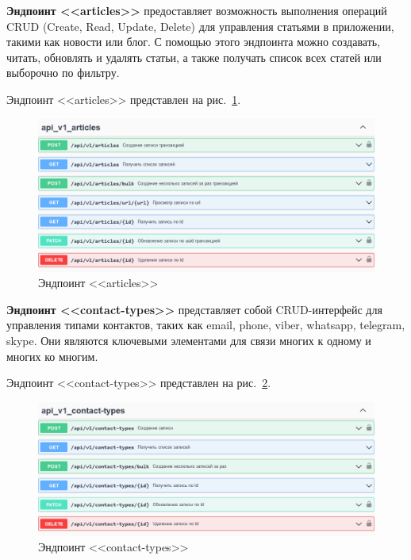 \textbf{Эндпоинт <<articles>>} предоставляет возможность выполнения операций CRUD (Create, Read, Update, Delete) для управления статьями в приложении,
такими как новости или блог.
С помощью этого эндпоинта можно создавать, читать, обновлять и удалять статьи,
а также получать список всех статей или выборочно по фильтру.

Эндпоинт <<articles>> представлен на рис.~\ref{fig:swagger_articles}.

\begin{figure}[!p]
    \centering

    \includegraphics[width=16cm]
    {images/swagger/articles.png}

    \caption{Эндпоинт <<articles>>}

    \label{fig:swagger_articles}
\end{figure}

\textbf{Эндпоинт <<contact-types>>} представляет собой CRUD-интерфейс для управления типами контактов,
таких как email, phone, viber, whatsapp, telegram, skype.
Они являются ключевыми элементами для связи многих к одному и многих ко многим.

Эндпоинт <<contact-types>> представлен на рис.~\ref{fig:swagger_contact_types}.

\begin{figure}[!p]
    \centering

    \includegraphics[width=16cm]
    {images/swagger/contact-types.png}

    \caption{Эндпоинт <<contact-types>>}

    \label{fig:swagger_contact_types}
\end{figure}

